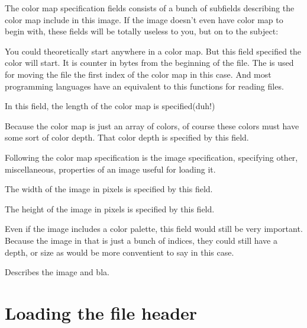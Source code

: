 \begin{refsection}

  The color map specification fields consists of a bunch of subfields
  describing the color map include in this image. If the image doesn't
  even have color map to begin with, these fields will be totally
  useless to you, but on to the subject:


  You could theoretically start anywhere in a color map. But this
  field specified the color will start. It is counter in bytes from
  the beginning of the file. The  is used for moving
  the file the first index of the color map in this case. And most
  programming languages have an equivalent to this functions for
  reading files.


  In this field, the length of the color map is specified(duh!)


  Because the color map is just an array of colors, of course these
  colors must have some sort of color depth. That color depth is
  specified by this field.


  Following the color map specification is the image specification,
  specifying other, miscellaneous, properties of an image useful for
  loading it.




  The width of the image in pixels is specified by this field.


  The height of the image in pixels is specified by this field.


  Even if the image includes a color palette, this field would still
  be very important. Because the image in that is just a bunch of
  indices, they could still have a depth, or size as would be more
  conventient to say in this case.


  Describes the image and bla.

  \section{Loading the file header}
  \label{sec:loading-file-header}


\end{refsection}
